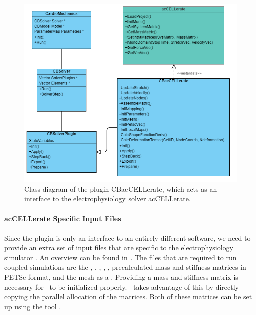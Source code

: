 \begin{figure}[h!t]
    \centering
    \includegraphics[width=1\linewidth]{Graphics/Classdiagram CBacCELLerate.png}
    \caption{Class diagram of the plugin CBacCELLerate, which acts as an interface to the electrophysiology solver acCELLerate.}
    \label{fig:CBacCELLerateUML}
\end{figure}

\paragraph{acCELLerate Specific Input Files} Since the plugin is only an interface to an entirely different software, we need to provide an extra set of input files that are specific to the electrophysiology simulator \ACC.
An overview can be found in .
The files that are required to run coupled simulations are the , , , , , precalculated mass and stiffness matrices in PETSc format, and the mesh as a .
Providing a mass and stiffness matrix is necessary for \ACC~to be initialized properly.
\CM~takes advantage of this by directly copying the parallel allocation of the matrices.
Both of these matrices can be set up using the tool .

